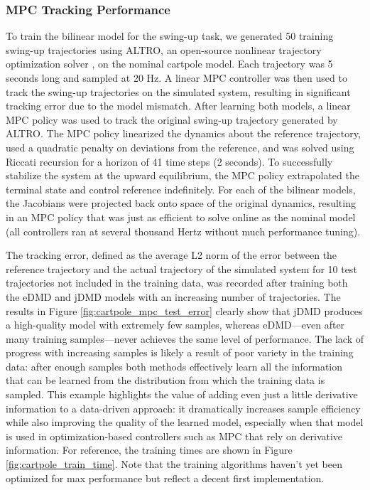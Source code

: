 \documentclass{article}
\begin{document}
\subsubsection{MPC Tracking Performance}

To train the bilinear model for the swing-up task, we generated 50 training swing-up
trajectories using ALTRO, an open-source nonlinear trajectory optimization solver 
\cite{Howell2019,Jackson2021}, on the nominal cartpole model. Each trajectory was 5 seconds
long and sampled at 20 Hz.  A linear MPC controller was then used to track the swing-up
trajectories on the simulated system, resulting in significant tracking error due to the
model mismatch.  After learning both models, a linear MPC policy was used to track the
original swing-up trajectory generated by ALTRO. The MPC policy linearized the dynamics
about the reference trajectory, used a quadratic penalty on deviations from the reference,
and was solved using Riccati recursion for a horizon of 41 time steps (2 seconds). To
successfully stabilize the system at the upward equilibrium, the MPC policy extrapolated the
terminal state and control reference indefinitely. For each of the bilinear models, the
Jacobians were projected back onto space of the original dynamics, resulting in an MPC
policy that was just as efficient to solve online as the nominal model (all controllers ran
at several thousand Hertz without much performance tuning). 

The tracking error, defined as the average L2 norm of the error between the reference 
trajectory and the actual trajectory of the simulated system for 10 test trajectories not 
included in the training data, was recorded after training both the eDMD and jDMD models
with an increasing number of trajectories. The results in Figure
\ref{fig:cartpole_mpc_test_error} clearly show that jDMD produces a high-quality model with
extremely few samples, whereas eDMD---even after many training samples---never achieves the 
same level of performance. The lack of progress with increasing samples is likely a result 
of poor variety in the training data: after enough samples both methods effectively learn 
all the information that can be learned from the distribution from which the training data 
is sampled. This example highlights the value of adding even just a little derivative 
information to a data-driven approach: it dramatically increases sample efficiency while 
also improving the quality of the learned model, especially when that model is used in 
optimization-based controllers such as MPC that rely on derivative information. For 
reference, the training times are shown in Figure \ref{fig:cartpole_train_time}. Note that 
the training algorithms haven't yet been optimized for max performance but reflect a decent 
first implementation.
\end{document}
